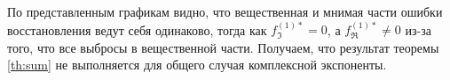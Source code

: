 \documentclass[specialist,
               substylefile = spbu.rtx,
               subf,href,colorlinks=true, 12pt]{disser}
\DeclareMathOperator{\sign}{sign}
\begin{document}
По представленным графикам видно, что вещественная и мнимая части ошибки восстановления ведут себя одинаково, тогда как $f^{(1)*}_{\Im} = 0$, а $f^{(1)*}_{\Re} \neq 0$ из-за того, что все выбросы в вещественной части. Получаем, что результат теоремы \ref{th:sum} не выполняется для общего случая комплексной экспоненты.


%
%
%
%
%
%
%
%
%
%
%
\end{document}
